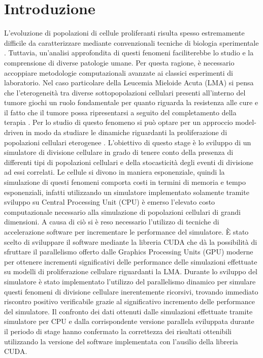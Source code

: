 
\chapter{Introduzione} %

\label{Introduzione} %



L’evoluzione di popolazioni di cellule proliferanti risulta spesso estremamente
difficile da caratterizzare mediante convenzionali tecniche di biologia
sperimentale \cite{bernitz2016stem}. Tuttavia, un’analisi approfondita di questi fenomeni
faciliterebbe lo studio e la comprensione di diverse patologie umane.
Per questa ragione, è necessario accoppiare metodologie computazionali 
avanzate ai classici esperimenti di laboratorio. Nel caso particolare della 
Leucemia Mieloide Acuta (LMA) si pensa che l'eterogeneità tra diverse 
sottopopolazioni cellulari presenti all'interno del tumore giochi un ruolo 
fondamentale per quanto riguarda la resistenza alle cure e il fatto che il 
tumore possa ripresentarsi a seguito del completamento della terapia 
\cite{dohner2015aml}.
Per lo studio di questo fenomeno si può optare per un approccio model-driven 
in modo da studiare le dinamiche riguardanti la proliferazione di 
popolazioni cellulari eterogenee \cite{aml2018unimib}. 
L'obiettivo di questo stage è lo sviluppo di un 
simulatore di divisione cellulare in grado di tenere conto della presenza 
di differenti tipi di popolazioni cellulari e della stocasticità degli eventi
di divisione ad essi correlati. Le cellule si divono in maniera esponenziale, 
quindi la simulazione di questi fenomeni comporta costi in termini di memoria 
e tempo esponenziali, infatti utilizzando un simulatore implementato 
solamente tramite sviluppo su Central Processing Unit (CPU) 
è emerso l'elevato costo 
computazionale necessario alla simulazione di popolazioni cellulari di grandi 
dimensioni. A causa di ciò si è reso necessario 
l'utilizzo di tecniche di accelerazione software per incrementare le 
performance del simulatore. È stato scelto di sviluppare il software 
mediante la libreria CUDA che dà la possibilità di sfruttare il parallelismo 
offerto dalle Graphics Processing Units (GPU) moderne per ottenere incrementi 
significativi delle performance delle simulazioni effettuate su modelli di 
proliferazione cellulare riguardanti la LMA.
Durante lo sviluppo del simulatore è stato implementato l'utilizzo del 
parallelismo dinamico per simulare questi fenomeni 
di divisione cellulare inerentemente ricorsivi, trovando immediato riscontro 
positivo verificabile grazie al significativo incremento delle performance 
del simulatore. Il confronto dei dati ottenuti dalle simulazioni effettuate
tramite simulatore per CPU e dalla corrispondente versione parallela 
sviluppata durante il periodo di stage hanno confermato la correttezza dei
risultati ottenibili utilizzando la versione del software implementata con
l'ausilio della libreria CUDA.
